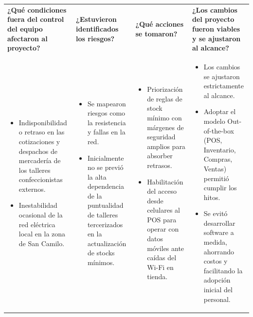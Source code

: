 \documentclass[11pt]{article}
\begin{document}
\begin{longtable}{|p{3.8cm}|p{3.8cm}|p{3.8cm}|p{3.8cm}|}
\rowcolor{RoundGray}\multicolumn{4}{|l|}{\textbf{Tercera Ronda}} \\ \hline
\rowcolor{HeaderGray}\textbf{¿Qué condiciones fuera del control del equipo afectaron al proyecto?} & \textbf{¿Estuvieron identificados los riesgos?} & \textbf{¿Qué acciones se tomaron?} & \textbf{¿Los cambios del proyecto fueron viables y se ajustaron al alcance?} \\ \hline
\begin{itemize}[leftmargin=*,nosep]
    \item Indisponibilidad o retraso en las cotizaciones y despachos de mercadería de los talleres confeccionistas externos.
    \item Inestabilidad ocasional de la red eléctrica local en la zona de San Camilo.
\end{itemize} &
\begin{itemize}[leftmargin=*,nosep]
    \item Se mapearon riesgos como la resistencia y fallas en la red.
    \item Inicialmente no se previó la alta dependencia de la puntualidad de talleres tercerizados en la actualización de stocks mínimos.
\end{itemize} &
\begin{itemize}[leftmargin=*,nosep]
    \item Priorización de reglas de stock mínimo con márgenes de seguridad amplios para absorber retrasos.
    \item Habilitación del acceso desde celulares al POS para operar con datos móviles ante caídas del Wi-Fi en tienda.
\end{itemize} &
\begin{itemize}[leftmargin=*,nosep]
    \item Los cambios se ajustaron estrictamente al alcance.
    \item Adoptar el modelo Out-of-the-box (POS, Inventario, Compras, Ventas) permitió cumplir los hitos.
    \item Se evitó desarrollar software a medida, ahorrando costos y facilitando la adopción inicial del personal.
\end{itemize} \\ \hline
\end{longtable}
\end{document}

